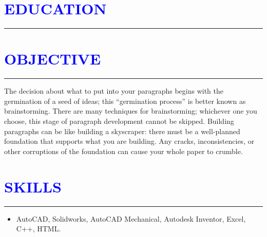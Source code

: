 \documentclass{article}
\begin{document}
\section*{\large{\textcolor{blue}{\uppercase{education}}}}
\hrule
\vspace{3pt}
\renewcommand{\labelitemii}{$\circ$}
 
\vspace{3pt}
\section*{\large{\textcolor{blue}{\uppercase{objective}}}}
\hrule
\vspace{3pt}
The decision about what to put into your paragraphs begins with the germination of a seed of ideas; this “germination process” is better known as brainstorming. There are many techniques for brainstorming; whichever one you choose, this stage of paragraph development cannot be skipped. Building paragraphs can be like building a skyscraper: there must be a well-planned foundation that supports what you are building. Any cracks, inconsistencies, or other corruptions of the foundation can cause your whole paper to crumble.
\vspace{3pt}

\section*{\large{\textcolor{blue}{\uppercase{Skills}}}}
\hrule
\vspace{3pt}
\begin{itemize}[noitemsep,nolistsep]
	\item AutoCAD, Solidworks, AutoCAD Mechanical, Autodesk Inventor, Excel, C++, HTML.
\end{itemize}
\vspace{3pt}
\end{document}
